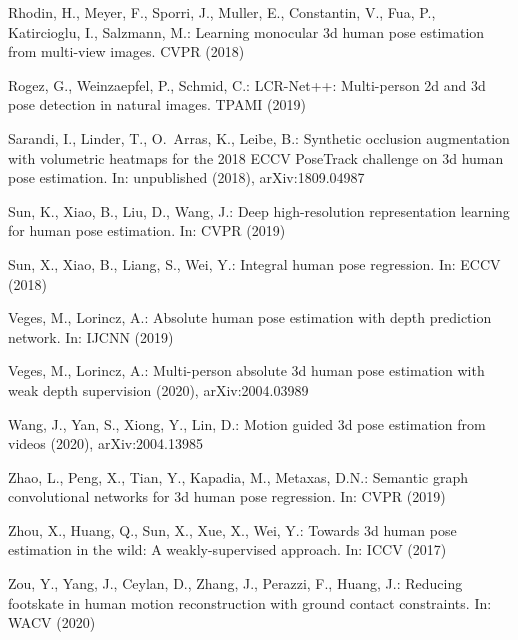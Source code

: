 \documentclass[runningheads, envcountsame, a4paper]{llncs}
\begin{document}
\begin{thebibliography}{10}
Rhodin, H., Meyer, F., Sporri, J., Muller, E., Constantin, V., Fua, P.,
  Katircioglu, I., Salzmann, M.: Learning monocular 3d human pose estimation
  from multi-view images. CVPR  (2018)

Rogez, G., Weinzaepfel, P., Schmid, C.: {LCR-Net}++: Multi-person 2d and 3d
  pose detection in natural images. TPAMI  (2019)

Sarandi, I., Linder, T., O.~Arras, K., Leibe, B.: Synthetic occlusion
  augmentation with volumetric heatmaps for the 2018 {ECCV PoseTrack} challenge
  on 3d human pose estimation. In: unpublished (2018), arXiv:1809.04987

Sun, K., Xiao, B., Liu, D., Wang, J.: Deep high-resolution representation
  learning for human pose estimation. In: CVPR (2019)

Sun, X., Xiao, B., Liang, S., Wei, Y.: Integral human pose regression. In: ECCV
  (2018)

{Veges}, M., {Lorincz}, A.: Absolute human pose estimation with depth
  prediction network. In: IJCNN (2019)

Veges, M., Lorincz, A.: Multi-person absolute 3d human pose estimation with
  weak depth supervision (2020), arXiv:2004.03989

Wang, J., Yan, S., Xiong, Y., Lin, D.: Motion guided 3d pose estimation from
  videos (2020), arXiv:2004.13985

Zhao, L., Peng, X., Tian, Y., Kapadia, M., Metaxas, D.N.: Semantic graph
  convolutional networks for 3d human pose regression. In: CVPR (2019)

Zhou, X., Huang, Q., Sun, X., Xue, X., Wei, Y.: Towards 3d human pose
  estimation in the wild: A weakly-supervised approach. In: ICCV (2017)

{Zou}, Y., {Yang}, J., {Ceylan}, D., {Zhang}, J., {Perazzi}, F., {Huang}, J.:
  Reducing footskate in human motion reconstruction with ground contact
  constraints. In: WACV (2020)

\end{thebibliography}
\end{document}

